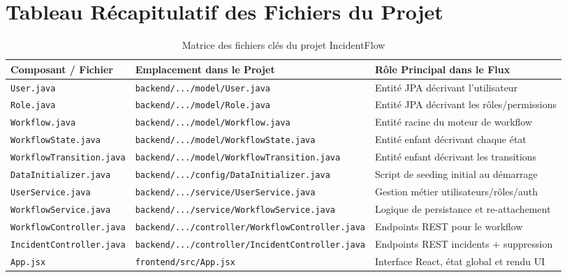 \documentclass[11pt,a4paper]{article}
\begin{document}
\section{Tableau Récapitulatif des Fichiers du Projet}

\begin{table}[H]
\centering
\small
\begin{tabular}{lll}
\toprule
\textbf{Composant / Fichier} & \textbf{Emplacement dans le Projet} & \textbf{Rôle Principal dans le Flux} \\
\midrule
\texttt{User.java} & \texttt{backend/.../model/User.java} & Entité JPA décrivant l'utilisateur \\
\texttt{Role.java} & \texttt{backend/.../model/Role.java} & Entité JPA décrivant les rôles/permissions \\
\texttt{Workflow.java} & \texttt{backend/.../model/Workflow.java} & Entité racine du moteur de workflow \\
\texttt{WorkflowState.java} & \texttt{backend/.../model/WorkflowState.java} & Entité enfant décrivant chaque état \\
\texttt{WorkflowTransition.java} & \texttt{backend/.../model/WorkflowTransition.java} & Entité enfant décrivant les transitions \\
\texttt{DataInitializer.java} & \texttt{backend/.../config/DataInitializer.java} & Script de seeding initial au démarrage \\
\texttt{UserService.java} & \texttt{backend/.../service/UserService.java} & Gestion métier utilisateurs/rôles/auth \\
\texttt{WorkflowService.java} & \texttt{backend/.../service/WorkflowService.java} & Logique de persistance et re-attachement \\
\texttt{WorkflowController.java} & \texttt{backend/.../controller/WorkflowController.java} & Endpoints REST pour le workflow \\
\texttt{IncidentController.java} & \texttt{backend/.../controller/IncidentController.java} & Endpoints REST incidents + suppression \\
\texttt{App.jsx} & \texttt{frontend/src/App.jsx} & Interface React, état global et rendu UI \\
\bottomrule
\end{tabular}
\caption{Matrice des fichiers clés du projet IncidentFlow}
\end{table}
\end{document}
